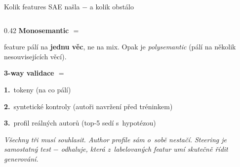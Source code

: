 \documentclass[aspectratio=169,10pt]{beamer}
\newcommand{\caveat}[1]{{\scriptsize\color{mutedText}\itshape #1}}
\begin{document}
\begin{frame}[t]{Kolik features SAE našla $-$ a kolik obstálo}
\begin{columns}[T,onlytextwidth]
\begin{column}{0.42\textwidth}
      {\small\textbf{Monosemantic $=$}}\par\vspace{1mm}
      {\footnotesize feature pálí na \textbf{jednu věc}, ne na mix. Opak je \emph{polysemantic} (pálí na několik nesouvisejících věcí).}\par\vspace{5mm}
      {\small\textbf{3-way validace $=$}}\par\vspace{1mm}
      {\footnotesize
      \textbf{1.}~tokeny (na co pálí)\par\vspace{0.5mm}
      \textbf{2.}~syntetické kontroly (autoři navržení před tréninkem)\par\vspace{0.5mm}
      \textbf{3.}~profil reálných autorů (top-5 sedí s~hypotézou)\par\vspace{2mm}
      }
      \caveat{Všechny tři musí souhlasit. Author profile sám o~sobě nestačí. Steering je samostatný test $-$ odhaluje, která z~labelovaných featur umí skutečně řídit generování.}
    \end{column}
  \end{columns}
\end{frame}
\end{document}
